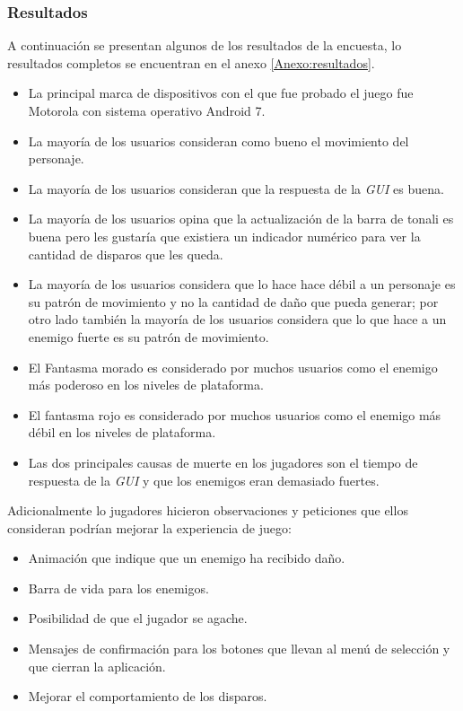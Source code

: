 \subsubsection{Resultados}
A continuación se presentan algunos de los resultados de la encuesta,
lo resultados completos se encuentran en el anexo \ref{Anexo:resultados}.
\begin{itemize}
        \item La principal marca de dispositivos con el que fue probado el juego fue
        Motorola con sistema operativo Android 7.
        \item La mayoría de los usuarios consideran como bueno el movimiento del
        personaje.
        \item La mayoría de los usuarios consideran que la respuesta de la
        \textit{GUI} es buena.
        \item La mayoría de los usuarios opina que la actualización de la barra de
        tonali es buena pero les gustaría que existiera un indicador numérico para ver
        la cantidad de disparos que les queda.
        \item La mayoría de los usuarios considera que lo hace hace débil a un personaje
        es su patrón de movimiento y no la cantidad de daño que pueda generar; por
        otro lado también la mayoría de los usuarios considera que lo que hace a un
        enemigo fuerte es su patrón de movimiento.
        \item El Fantasma morado es considerado por muchos usuarios como el enemigo más
        poderoso en los niveles de plataforma.
        \item El fantasma rojo es considerado por muchos usuarios como el enemigo más
        débil en los niveles de plataforma.
        \item Las dos principales causas de muerte en los jugadores son el tiempo
        de respuesta de la \textit{GUI} y que los enemigos eran demasiado fuertes.
\end{itemize}

Adicionalmente lo jugadores hicieron observaciones y peticiones que ellos
consideran podrían mejorar la experiencia de juego:
\begin{itemize}
        \item Animación que indique que un enemigo ha recibido daño.
        \item Barra de vida para los enemigos.
        \item Posibilidad de que el jugador se agache.
        \item Mensajes de confirmación para los botones que llevan al menú de selección
        y que cierran la aplicación.
        \item Mejorar el comportamiento de los disparos.
\end{itemize}

